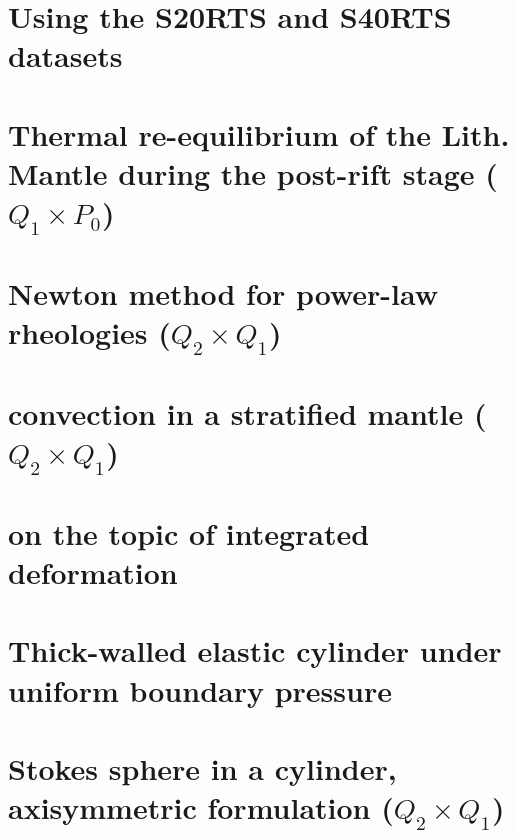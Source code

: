 \documentclass[a4paper,11pt]{report}
\begin{document}
\chapter{Using the S20RTS and S40RTS datasets \label{f85}} %

\chapter{Thermal re-equilibrium of the Lith. Mantle during the post-rift stage ($Q_1\times P_0$) \label{f86}} %

\chapter{Newton method for power-law rheologies ($Q_2\times Q_1$) \label{f87}} %

\chapter{convection in a stratified mantle ($Q_2\times Q_1$) \label{f88}} %

\chapter{on the topic of integrated deformation	\label{f89}} %

\chapter{Thick-walled elastic cylinder under uniform boundary pressure \label{f90}} %

\chapter{Stokes sphere in a cylinder, axisymmetric formulation ($Q_2\times Q_1$) \label{f91}} %
\end{document}
